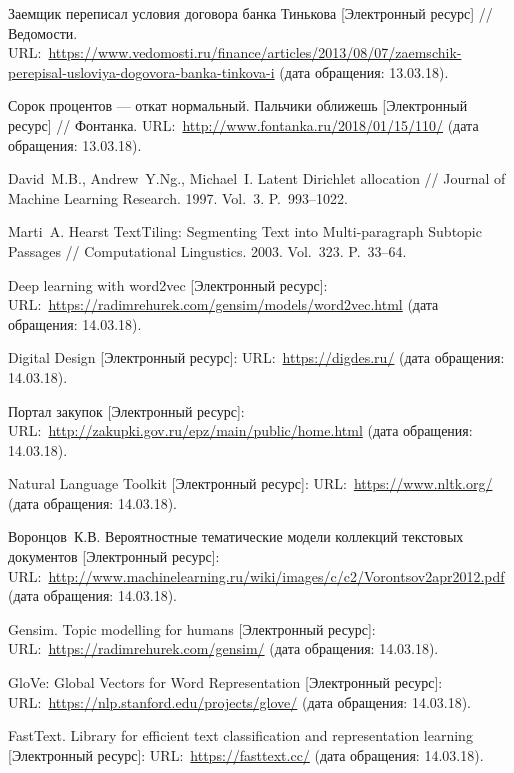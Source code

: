 \documentclass[14pt]{matmex-diploma-custom}
\begin{document}
\newpage
\begin{thebibliography}{99}
	\vspace{-7pt}
	
	 Заемщик переписал условия договора банка Тинькова [Электронный ресурс] // Ведомости.  URL:~\url{https://www.vedomosti.ru/finance/articles/2013/08/07/zaemschik-perepisal-usloviya-dogovora-banka-tinkova-i} (дата обращения: 13.03.18).
	
	 Сорок процентов --- откат нормальный. Пальчики оближешь [Электронный ресурс] // Фонтанка. URL:~\url{http://www.fontanka.ru/2018/01/15/110/} (дата обращения: 13.03.18).
	
	 David~M.\:B., Andrew~Y.\:Ng., Michael~I. Latent Dirichlet allocation // Journal of Machine Learning Research. 1997. Vol.~3. P.~993--1022.
	
	 Marti~A. Hearst TextTiling: Segmenting Text into Multi-paragraph Subtopic Passages // Computational Lingustics. 2003. Vol.~323. P.~33--64.
	
	 Deep learning with word2vec [Электронный ресурс]: URL:~\url{https://radimrehurek.com/gensim/models/word2vec.html} (дата обращения: 14.03.18).
	
	  Digital Design [Электронный ресурс]: URL:~\url{https://digdes.ru/} (дата обращения: 14.03.18).
	
	 Портал закупок [Электронный ресурс]: URL:~\url{http://zakupki.gov.ru/epz/main/public/home.html} (дата обращения: 14.03.18).
	
	 Natural Language Toolkit [Электронный ресурс]: URL:~\url{https://www.nltk.org/} (дата обращения: 14.03.18).
	
	 Воронцов~К.\:В. Вероятностные тематические модели коллекций текстовых документов [Электронный ресурс]: URL:~\url{http://www.machinelearning.ru/wiki/images/c/c2/Vorontsov2apr2012.pdf} (дата обращения: 14.03.18).
	
	  Gensim. Topic modelling for humans [Электронный ресурс]: URL:~\url{https://radimrehurek.com/gensim/} (дата обращения: 14.03.18).
	
	  GloVe: Global Vectors for Word Representation [Электронный ресурс]: URL:~\url{https://nlp.stanford.edu/projects/glove/} (дата обращения: 14.03.18).
	
	  FastText. Library for efficient text classification and representation learning [Электронный ресурс]: URL:~\url{https://fasttext.cc/} (дата обращения: 14.03.18).
	

\end{thebibliography}
\end{document}
